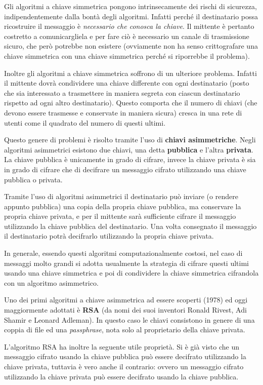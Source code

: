 \documentclass[italian,]{article}
\begin{document}
Gli algoritmi a chiave simmetrica pongono intrinsecamente dei rischi di
sicurezza, indipendentemente dalla bontà degli algoritmi. Infatti perché
il destinatario possa ricostruire il messaggio è \emph{necessario che
conosca la chiave}. Il mittente è pertanto costretto a comunicargliela e
per fare ciò è necessario un canale di trasmissione sicuro, che però
potrebbe non esistere (ovviamente non ha senso crittografare una chiave
simmetrica con una chiave simmetrica perché si riporrebbe il problema).

Inoltre gli algoritmi a chiave simmetrica soffrono di un ulteriore
problema. Infatti il mittente dovrà condividere una chiave differente
con ogni destinatario (posto che sia interessato a trasmettere in
maniera segreta con ciascun destinatario rispetto ad ogni altro
destinatario). Questo comporta che il numero di chiavi (che devono
essere trasmesse e conservate in maniera sicura) cresca in una rete di
utenti come il quadrato del numero di questi ultimi.

Questo genere di problemi è risolto tramite l'uso di \textbf{chiavi
asimmetriche}. Negli algoritmi asimmetrici esistono due chiavi, una
detta \textbf{pubblica} e l'altra \textbf{privata}. La chiave pubblica è
unicamente in grado di cifrare, invece la chiave privata è sia in grado
di cifrare che di decifrare un messaggio cifrato utilizzando una chiave
pubblica o privata.

Tramite l'uso di algoritmi asimmetrici il destinatario può inviare (o
rendere appunto pubblica) una copia della propria chiave pubblica, ma
conservare la propria chiave privata, e per il mittente sarà sufficiente
cifrare il messaggio utilizzando la chiave pubblica del destinatario.
Una volta consegnato il messaggio il destinatario potrà decifrarlo
utilizzando la propria chiave privata.

In generale, essendo questi algoritmi computazionalmente costosi, nel
caso di messaggi molto grandi si adotta usualmente la strategia di
cifrare questi ultimi usando una chiave simmetrica e poi di condividere
la chiave simmetrica cifrandola con un algoritmo asimmetrico.

Uno dei primi algoritmi a chiave asimmetrica ad essere scoperti (1978)
ed oggi maggiormente adottati è \textbf{RSA} (da nomi dei suoi inventori
Ronald Rivest, Adi Shamir e Leonard Adleman). In questo caso le chiavi
consistono in genere di una coppia di file ed una \emph{passphrase},
nota solo al proprietario della chiave privata.

L'algoritmo RSA ha inoltre la seguente utile proprietà. Si è già visto
che un messaggio cifrato usando la chiave pubblica può essere decifrato
utilizzando la chiave privata, tuttavia è vero anche il contrario:
ovvero un messaggio cifrato utilizzando la chiave privata può essere
decifrato usando la chiave pubblica.
\end{document}
